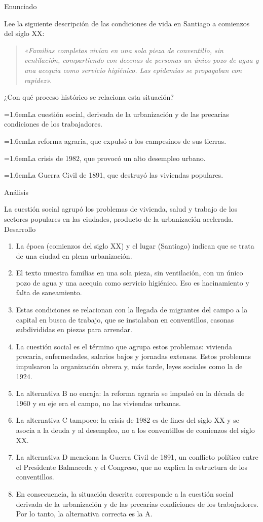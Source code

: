 \documentclass[10pt,a4paper,twocolumn]{article}
\newcommand{\alternativa}[2]{\par\noindent\hangindent=1.6em\hangafter=1\makebox[1.6em][l]{\tecla{#1}}#2\par}
\newcommand{\clave}[1]{\par\smallskip{\sffamily\footnotesize\color{esmeralda} Clave \teclaok{#1}}\par}
\begin{document}
\begin{ejemplo}
{\sffamily\footnotesize\color{zinc500} Enunciado}\par
Lee la siguiente descripción de las condiciones de vida en Santiago a comienzos del siglo XX:

\begin{quote}\itshape «Familias completas vivían en una sola pieza de conventillo, sin ventilación, compartiendo con decenas de personas un único pozo de agua y una acequia como servicio higiénico. Las epidemias se propagaban con rapidez».\end{quote}

¿Con qué proceso histórico se relaciona esta situación?
\alternativa{A}{La cuestión social, derivada de la urbanización y de las precarias condiciones de los trabajadores.}
\alternativa{B}{La reforma agraria, que expulsó a los campesinos de sus tierras.}
\alternativa{C}{La crisis de 1982, que provocó un alto desempleo urbano.}
\alternativa{D}{La Guerra Civil de 1891, que destruyó las viviendas populares.}
\clave{A}
{\sffamily\footnotesize\color{zinc500} Análisis}\par La cuestión social agrupó los problemas de vivienda, salud y trabajo de los sectores populares en las ciudades, producto de la urbanización acelerada.
{\sffamily\footnotesize\color{zinc500} Desarrollo}
\begin{enumerate}
  \item La época (comienzos del siglo XX) y el lugar (Santiago) indican que se trata de una ciudad en plena urbanización.
  \item El texto muestra familias en una sola pieza, sin ventilación, con un único pozo de agua y una acequia como servicio higiénico. Eso es hacinamiento y falta de saneamiento.
  \item Estas condiciones se relacionan con la llegada de migrantes del campo a la capital en busca de trabajo, que se instalaban en conventillos, casonas subdivididas en piezas para arrendar.
  \item La cuestión social es el término que agrupa estos problemas: vivienda precaria, enfermedades, salarios bajos y jornadas extensas. Estos problemas impulsaron la organización obrera y, más tarde, leyes sociales como la de 1924.
  \item La alternativa B no encaja: la reforma agraria se impulsó en la década de 1960 y su eje era el campo, no las viviendas urbanas.
  \item La alternativa C tampoco: la crisis de 1982 es de fines del siglo XX y se asocia a la deuda y al desempleo, no a los conventillos de comienzos del siglo XX.
  \item La alternativa D menciona la Guerra Civil de 1891, un conflicto político entre el Presidente Balmaceda y el Congreso, que no explica la estructura de los conventillos.
  \item En consecuencia, la situación descrita corresponde a la cuestión social derivada de la urbanización y de las precarias condiciones de los trabajadores. Por lo tanto, la alternativa correcta es la A.
\end{enumerate}
\end{ejemplo}
\end{document}
